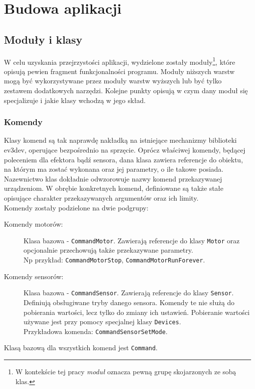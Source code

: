 \chapter{Budowa aplikacji}

\section{Moduły i klasy}
\indent \indent W celu uzyskania przejrzystości aplikacji, wydzielone zostały moduły\footnote{W kontekście tej pracy \textit{moduł} oznacza pewną grupę skojarzonych ze sobą klas.}, które opisują pewien fragment funkcjonalności programu. Moduły niższych warstw mogą być wykorzystywane przez moduły warstw wyższych lub być tylko zestawem dodatkowych narzędzi. Kolejne punkty opisują w czym dany moduł się specjalizuje i jakie klasy wchodzą w jego skład.

\subsection{Komendy}
\indent \indent Klasy komend są tak naprawdę nakładką na istniejące mechanizmy biblioteki ev3dev, operujące bezpośrednio na sprzęcie. Oprócz właściwej komendy, będącej poleceniem dla efektora bądź sensora, dana klasa zawiera referencje do obiektu, na którym ma zostać wykonana oraz jej parametry, o ile takowe posiada. Nazewnictwo klas dokładnie odwzorowuje nazwy komend przekazywanej urządzeniom. W obrębie konkretnych komend, definiowane są także stałe opisujące charakter przekazywanych argumentów oraz ich limity.\\
Komendy zostały podzielone na dwie podgrupy:
\begin{description}
    \item[Komendy motorów:] Klasa bazowa - {\tt CommandMotor}. Zawierają referencje do klasy {\tt Motor} oraz opcjonalnie przechowują także przekazywane parametry. \\Np przykład: {\tt CommandMotorStop}, {\tt CommandMotorRunForever}.

    \item[Komendy sensorów:] Klasa bazowa - {\tt CommandSensor}. Zawierają referencje do klasy {\tt Sensor}. Definiują obsługiwane tryby danego sensora. Komendy te nie służą do pobierania wartości, lecz tylko do zmiany ich ustawień. Pobieranie wartości używane jest przy pomocy specjalnej klasy {\tt Devices}. \\Przykładowa komenda: {\tt CommandSensorSetMode}.
\end{description}
Klasą bazową dla wszystkich komend jest {\tt Command}.

